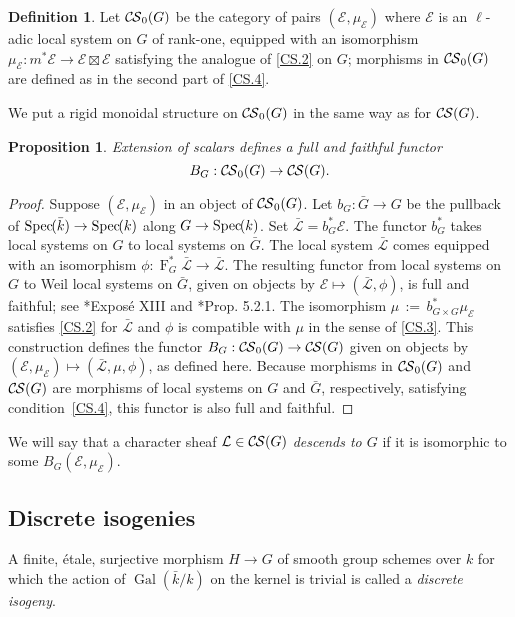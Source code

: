 \documentclass[10pt]{amsart}
\theoremstyle{plain}
\newtheorem{proposition}[theorem]{Proposition}
\theoremstyle{definition}
\newtheorem{definition}[theorem]{Definition}
\theoremstyle{remark}
\newcommand{\bFq}{\bar{k}}
\newcommand{\Fq}{k}
\DeclareMathOperator{\Gal}{Gal}
\newcommand{\Frob}[1]{\operatorname{F}_{#1}}
\newcommand{\Spec}[1]{{\operatorname{Spec}\hskip-1pt( #1 )}}
\newcommand{\ceq}{{\, :=\, }}
\newcommand{\cs}[1]{{\mathcal{#1}}}
\newcommand{\gcs}[1]{{\mathcal{\bar #1}}}
\newcommand{\CS}{{\mathcal{C\hskip-0.8pt S}}}
\newcommand{\bCS}{{\CS_0}}
\newcommand{\bG}{\bar{G}}
\begin{document}
\begin{definition}
Let $\bCS(G)$ be the category of pairs $(\cs{E},\mu_\cs{E})$
where $\cs{E}$ is an $\ell$-adic local system on $G$ of rank-one,
equipped with an isomorphism $\mu_\cs{E} : m^* \cs{E} \to \cs{E} \boxtimes \cs{E}$
satisfying the analogue of \ref{CS.2} on $G$;
morphisms in $\bCS(G)$ are defined as in the second part of
\ref{CS.4}.
\end{definition}

We put a rigid monoidal structure on $\bCS(G)$ in the same way as for $\CS(G)$.

\begin{proposition}\label{prop:BG}
Extension of scalars defines a full and faithful functor
\[
B_G : \bCS(G) \to \CS(G).
\]
\end{proposition}

\begin{proof}
 Suppose $(\cs{E},\mu_\cs{E})$ in an object of $\bCS(G)$.
 Let $b_G : {\bar G} \to G$ be the pullback of $\Spec{\bFq} \to \Spec{\Fq}$ along $G\to \Spec{\Fq}$.
 Set $\gcs{L} = b_G^* \cs{E}$. 
 The functor $b_G^*$ takes local systems on $G$ to local systems on $\bG$.
 The local system $\gcs{L}$ comes equipped with an isomorphism
 $\phi: \Frob{G}^* \gcs{L} \to \gcs{L}$.
 The resulting functor from local systems on $G$ to Weil local systems on $\bG$, given on objects by $\cs{E} \mapsto (\gcs{L},\phi)$, 
 is full and faithful; see \cite{deligne-katz:SGA7.2}*{Expos\'e XIII} and \cite{beilinson-bernstein-deligne:81a}*{Prop. 5.2.1}.
 The isomorphism $\mu \ceq b_{G\times G}^*\mu_\cs{E}$ satisfies \ref{CS.2}
 for $\gcs{L}$ and $\phi$ is compatible with $\mu$ in the sense of \ref{CS.3}.
 This construction defines the functor $B_G : \bCS(G) \to \CS(G)$ given on objects by $(\cs{E},\mu_\cs{E}) \mapsto (\gcs{L},\mu, \phi)$, as defined here. 
 Because morphisms in $\bCS(G)$ and $\CS(G)$ are morphisms of local systems on $G$ and $\bG$, respectively, satisfying condition~\ref{CS.4}, this functor is also full and faithful.
\end{proof}

We will say that a character sheaf $\cs{L} \in \CS(G)$ \emph{descends to $G$} if it is isomorphic to some $B_G(\cs{E}, \mu_\cs{E})$.

\subsection{Discrete isogenies}\label{ssec:discrete_isogenies}

A finite, \'etale, surjective morphism $H\to G$ of smooth group schemes over $\Fq$ for which the action of $\Gal(\bFq/\Fq)$ on the kernel is trivial is called a {\it discrete isogeny}.
\end{document}
